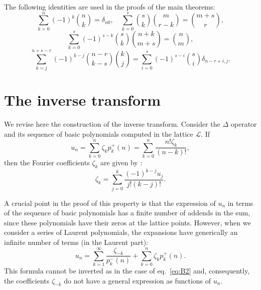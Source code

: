 \documentclass[10pt]{amsart}
\numberwithin{equation}{section}
\theoremstyle{definition}
\begin{document}
\label{AppendixA}

The following identities are used in the proofs of the main theorems:
\begin{equation}
\sum _{k=0}^{n}(-1)^{k}\binom{n}{k} =\delta _{n0},\quad \sum _{k=0}^{r}
\binom{s}{k}\binom{m}{r-k}=\binom{m+s}{r},
\label{eqA.1}
\end{equation}
\begin{equation}
\label{delt}
\sum _{k=0}^{s}(-1)^{s-k}\binom{s}{k}\binom{n+k}{m+s}=\binom{n}{m},
\end{equation}
\begin{equation}
\sum _{k=j}^{n+s-r} (-1)^{k-j} \binom{n-r}{k-s}\binom{k}{j}=\sum _{i=0}^{s}(-1)^{s-i}
\binom{s}{i}\delta _{n-r+i,j}.
\label{eqA.3}
\end{equation}

\section{The inverse transform}
\label{AppendixB}

We revise here the construction of the inverse transform. Consider the
$\Delta $ operator and its sequence of basic polynomials computed in the
lattice $\mathcal{L}$. If
\begin{equation}
u_{n}=\sum _{k=0}^{n} \zeta _{k}p^{+}_{k}(n)=\sum _{k=0}^{n}
\frac{n!\zeta _{k}}{(n-k)!},
\label{eqB.1}
\end{equation}
then the Fourier coefficients $\zeta _{k}$ are given by
\cite{TempestaJDE}:
\begin{equation}
\label{eq:B2}
\zeta _{k}=\sum _{j=0}^{k} \frac{(-1)^{k-j}u_{j}}{j!(k-j)!}.
\end{equation}

A crucial point in the proof of this property is that the expression of
$u_{n}$ in terms of the sequence of basic polynomials has a finite number
of addends in the sum, since these polynomials have their zeros at the
lattice points. However, when we consider a series of Laurent polynomials,
the expansions have generically an infinite number of terms (in the Laurent
part):
\begin{equation}
u_{n}=\sum _{k=1}^{\infty} \frac{\zeta _{-k}}{p^{-}_{k}(n)}+\sum _{k=0}^{n}
\zeta _{k} p^{+}_{k}(n).
\label{eqB.3}
\end{equation}
This formula cannot be inverted as in the case of  eq.~\eqref{eq:B2} and,
consequently, the coefficients $\zeta _{-k}$ do not have a general expression
as functions of $u_{n}$.
\end{document}
